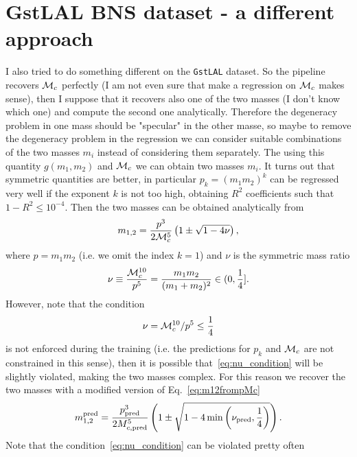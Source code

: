 \documentclass[prd,aps,twocolumn,a4paper,showkeys,nofootinbib]{article}
\def\Mc{{\cal M}_c}
\begin{document}
\section{GstLAL BNS dataset - a different approach}
\label{sec:GstLAL2}
I also tried to do something different on the \texttt{GstLAL} dataset. 
So the pipeline recovers $\Mc$ perfectly (I am not even sure that make a regression on $\Mc$
makes sense), then I suppose that it recovers also one of the two masses 
(I don't know which one) and compute the second one analytically. Therefore the degeneracy problem
in one mass should be "specular" in the other masse, so maybe to remove the degeneracy problem
in the regression we can consider suitable combinations of the two masses $m_i$ instead of 
considering them separately. The using this quantity $g(m_1,m_2)$ and $\Mc$ we can obtain 
two masses $m_i$. It turns out that symmetric quantities are better, in particular 
$p_k= (m_1 m_2)^k$ can be regressed very well if the exponent $k$ is not too high, 
obtaining $R^2$ coefficients such that $1-R^2 \leq 10^{-4}$. Then the two masses can be
obtained analytically from
\begin{equation}
\label{eq:m12frompMc}
m_{1,2} = \frac{p^3}{2 \Mc^5}\left( 1 \pm \sqrt{1-4\nu} \right),
\end{equation}
where $p=m_1 m_2$ (i.e. we omit the index $k=1$) and $\nu$ is the symmetric mass ratio
\begin{equation}
\nu \equiv \frac{\Mc^{10}}{p^5} = \frac{m_1 m_2}{(m_1+m_2)^2}\in (0, \frac{1}{4}].
\end{equation}
However, note that the condition
\begin{equation}
\label{eq:nu_condition}
\nu=\Mc^{10}/p^5\leq \frac{1}{4}
\end{equation} 
is not enforced during the training (i.e. the predictions for 
$p_k$ and $\Mc$ are not constrained in this sense), 
then it is possible that~\eqref{eq:nu_condition} will be slightly violated, making
the two masses complex. For this reason we recover the two masses with a modified version
of Eq.~\eqref{eq:m12frompMc}
\begin{equation}
\label{eq:m12frompMc_mod}
m_{1,2}^{\rm pred} = \frac{p_{\rm pred}^3}{2 M_{c, \rm pred}^5}\left( 1 \pm \sqrt{1-4 \min\left(\nu_{\rm pred}, \frac{1}{4}\right)} \right).
\end{equation}
Note that the condition~\eqref{eq:nu_condition} can be violated pretty often 
\end{document}
